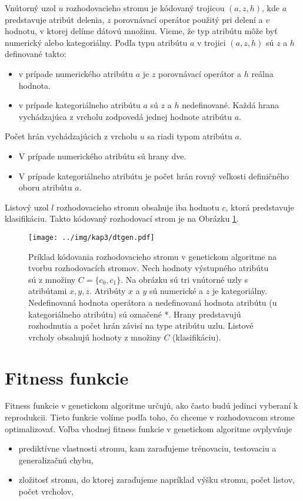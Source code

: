 Vnútorný uzol $u$ rozhodovacieho stromu je kódovaný trojicou $(a,z,h)$, kde $a$ predstavuje atribút delenia, $z$ porovnávací operátor použitý pri delení a $v$ hodnotu, v ktorej delíme dátovú množinu. Vieme, že typ atribútu môže byť numerický alebo kategoriálny. Podľa typu atribútu $a$ v trojici $(a,z,h)$ sú $z$ a $h$ definované takto:
\begin{itemize}
\item v prípade numerického atribútu $a$ je $z$ porovnávací operátor a $h$ reálna hodnota.
\item v prípade kategoriálneho atribútu $a$ sú $z$ a $h$ nedefinované. Každá hrana vychádzajúca z vrcholu zodpovedá jednej hodnote atribútu $a$.
\end{itemize}
Počet hrán vychádzajúcich z vrcholu $u$ sa riadi typom atribútu $a$.
\begin{itemize}
\item V prípade numerického atribútu sú hrany dve.
\item V prípade kategoriálneho atribútu je počet hrán rovný veľkosti definičného oboru atribútu $a$.
\end{itemize}
Listový uzol $l$ rozhodovacieho stromu obsahuje iba hodnotu $c$, ktorá predstavuje klasifikáciu.
Takto kódovaný rozhodovací strom je na Obrázku \ref{fig:DTEncode}.

\begin{figure}[h]
\centering
\centerline{\mbox{\texttt{[image: ../img/kap3/dtgen.pdf]}}}
\caption{Príklad kódovania rozhodovacieho stromu v genetickom algoritme na tvorbu rozhodovacích stromov. Nech hodnoty výstupného atribútu sú z množiny $C=\{c_0,c_1\}$. Na obrázku sú tri vnútorné uzly s atribútami $x,y,z$. Atribúty $x$ a $y$ sú numerické a $z$ je kategoriálny. Nedefinovaná hodnota operátora a nedefinovaná hodnota atribútu (u kategoriálneho atribútu) sú označené *. Hrany predstavujú rozhodnutia a počet hrán závisí na type atribútu uzlu. Listové vrcholy obsahujú hodnoty z množiny $C$ (klasifikáciu).}\label{fig:DTEncode}
\end{figure}

\section{Fitness funkcie}\label{kap3:3.3:Fitness}
Fitness funkcie v genetickom algoritme určujú, ako často budú jedinci vyberaní k reprodukcii. Tieto funkcie volíme podľa toho, čo chceme v rozhodovacom strome optimalizovať. Voľba vhodnej fitness funkcie v genetickom algoritme ovplyvňuje
\begin{itemize}
\item prediktívne vlastnosti stromu, kam zaraďujeme trénovaciu, testovaciu a generalizačnú chybu, 
\item zložitosť stromu, do ktorej zaraďujeme napríklad výšku stromu, počet listov, počet vrcholov,
\end{itemize} 

